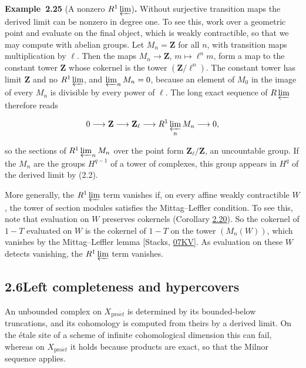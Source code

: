 \documentclass[11pt]{article}
\newenvironment{bpstatement}[2]{\par\addvspace{0.6\baselineskip}\noindent\textbf{#1}#2\textbf{.}\enspace\ignorespaces}
  {\par\addvspace{0.4\baselineskip}}
\begin{document}
\label{bp73}%
\begin{bpstatement}{Example~2.25}{ (A nonzero $R^1\varprojlim$)}
Without surjective transition maps the derived limit can be nonzero in degree one. To see this, work over a geometric point and evaluate on the final object, which is weakly contractible, so that we may compute with abelian groups. Let \(M_n=\mathbf Z\) for all \(n\), with transition maps multiplication by \(\ell\). Then the maps \(M_n\to\mathbf Z\), \(m\mapsto\ell^nm\), form a map to the constant tower \(\mathbf Z\) whose cokernel is the tower \((\mathbf Z/\ell^n)\). The constant tower has limit \(\mathbf Z\) and no \(R^1\varprojlim\), and \(\varprojlim_nM_n=0\), because an element of \(M_0\) in the image of every \(M_n\) is divisible by every power of \(\ell\). The long exact sequence of \(R\varprojlim\) therefore reads

\[
0\longrightarrow\mathbf Z\longrightarrow\mathbf Z_\ell\longrightarrow R^1\varprojlim_nM_n\longrightarrow0,
\]

so the sections of \(R^1\varprojlim_nM_n\) over the point form \(\mathbf Z_\ell/\mathbf Z\), an uncountable group. If the \(M_n\) are the groups \(H^{q-1}\) of a tower of complexes, this group appears in \(H^q\) of the derived limit by (2.2).
\end{bpstatement}

\label{bp74}%
More generally, the \(R^1\varprojlim\) term vanishes if, on every affine weakly contractible \(W\), the tower of section modules satisfies the Mittag–Leffler condition. To see this, note that evaluation on \(W\) preserves cokernels (Corollary \hyperref[bp59]{2.20}). So the cokernel of \(1-T\) evaluated on \(W\) is the cokernel of \(1-T\) on the tower \((M_n(W))\), which vanishes by the Mittag–Leffler lemma [Stacks, \href{https://stacks.math.columbia.edu/tag/07KV}{07KV}]. As evaluation on these \(W\) detects vanishing, the \(R^1\varprojlim\) term vanishes.


\subsection*{\texorpdfstring{2.6\quad Left completeness and hypercovers}{2.6 Left completeness and hypercovers}}
\label{bp75}%
\label{bp76}%
An unbounded complex on \(X_{\mathrm{pro}\acute{e}t}\) is determined by its bounded-below truncations, and its cohomology is computed from theirs by a derived limit. On the étale site of a scheme of infinite cohomological dimension this can fail, whereas on \(X_{\mathrm{pro}\acute{e}t}\) it holds because products are exact, so that the Milnor sequence applies.
\end{document}
